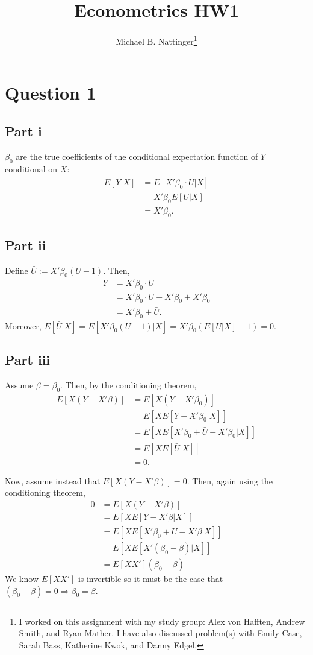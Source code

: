 \documentclass[11pt]{article} %
\title{Econometrics HW1}
\author{Michael B. Nattinger\footnote{I worked on this assignment with my study group: Alex von Hafften, Andrew Smith, and Ryan Mather. I have also discussed problem(s) with Emily Case, Sarah Bass, Katherine Kwok, and Danny Edgel.}}
\begin{document}
\maketitle

\section{Question 1}
\subsection{Part i}
$\beta_0$ are the true coefficients of the conditional expectation function of $Y$ conditional on $X$:
\begin{align*}
E[Y|X] &= E[X'\beta_0 \cdot U|X]\\
&= X'\beta_0E[U|X]\\
&= X'\beta_0.
\end{align*}
\subsection{Part ii}
Define $\bar{U}:= X'\beta_0 (U-1)$. Then,
\begin{align*}
Y &= X'\beta_0 \cdot U\\
&= X'\beta_0 \cdot U - X'\beta_0 + X'\beta_0 \\
&= X'\beta_0 +\bar{U}.
\end{align*}
Moreover, $E[\bar{U}|X] = E[ X'\beta_0 (U-1)|X] = X'\beta_0(E[U|X] - 1) = 0$.
\subsection{Part iii}
Assume $\beta = \beta_0.$ Then, by the conditioning theorem,
\begin{align*}
E[X(Y-X'\beta)] &= E[X(Y-X'\beta_0)]\\
&=  E[XE[Y-X'\beta_0|X]]\\
&= E[XE[X'\beta_0 + \bar{U}-X'\beta_0|X]]\\
&= E[XE[\bar{U}|X]]\\
&=0.
\end{align*}

Now, assume instead that $E[X(Y-X'\beta)] = 0.$ Then, again using the conditioning theorem,
\begin{align*}
0 &= E[X(Y-X'\beta)] \\
&= E[XE[Y-X'\beta|X]] \\
&= E[XE[X'\beta_0 +\bar{U}-X'\beta|X]] \\
&=  E[XE[X'(\beta_0 -\beta)|X]] \\
&= E[XX'](\beta_0 -\beta)
\end{align*}
We know $E[XX']$ is invertible so it must be the case that $(\beta_0 -\beta) = 0\Rightarrow \beta_0 = \beta$.
\end{document}
